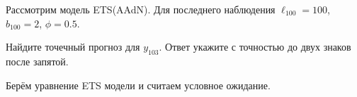 
\begin{question}
Рассмотрим модель ETS(AAdN).
Для последнего наблюдения \(\ell_{100} = 100\), \(b_{100} = 2\), \(\phi = 0.5\).

Найдите точечный прогноз для \(y_{103}\). Ответ укажите с точностью до двух знаков после запятой.
\end{question}

\begin{solution}
Берём уравнение ETS модели и считаем условное ожидание.
\end{solution}

